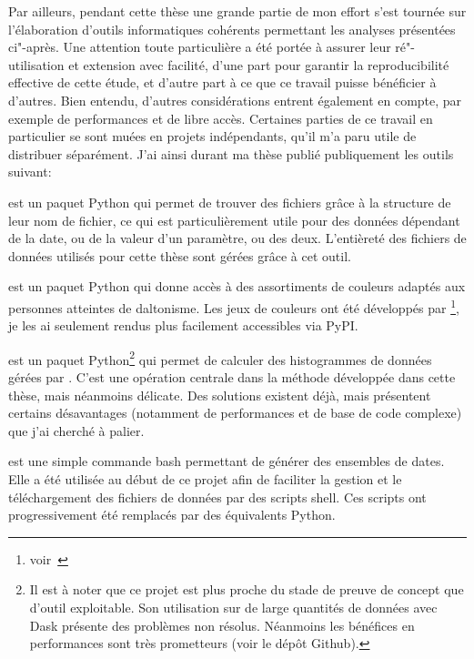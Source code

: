 Par ailleurs, pendant cette thèse une grande partie de mon effort s'est tournée sur l'élaboration d'outils informatiques cohérents  permettant les analyses présentées ci"-après.
Une attention toute particulière a été portée à assurer leur ré"-utilisation et extension avec facilité, d'une part pour garantir la reproducibilité effective de cette étude, et d'autre part à ce que ce travail puisse bénéficier à d'autres.
Bien entendu, d'autres considérations entrent également en compte, par exemple de performances et de libre accès.
Certaines parties de ce travail en particulier se sont muées en projets indépendants, qu'il m'a paru utile de distribuer séparément.
J'ai ainsi durant ma thèse publié publiquement les outils suivant:
\begingroup
\resetbegentry
{}
\begin{description}
  \setlength{\itemsep}{1.8\onelineskip}
  \item[FileFinder]
        est un paquet Python qui permet  de trouver des fichiers grâce à la structure de leur nom de fichier, ce qui est particulièrement utile pour des données dépendant de la date, ou de la valeur d'un paramètre, ou des deux.
        L'entièreté des fichiers de données utilisés pour cette thèse sont gérées grâce à cet outil.

  \item[tol-colors]
        est un paquet Python qui donne accès à des assortiments de couleurs adaptés aux personnes atteintes de daltonisme.
        Les jeux de couleurs ont été développés par \footnote{voir~}, je les ai seulement rendus plus facilement accessibles via PyPI.

  \item[Xarray-histogram]
        est un paquet Python\footnote{%
        Il est à noter que ce projet est plus proche du stade de preuve de concept que d'outil exploitable.
        Son utilisation sur de large quantités de données avec Dask présente des problèmes non résolus.
        Néanmoins les bénéfices en performances sont très prometteurs (voir le dépôt Github).
        } qui permet de calculer des histogrammes de données gérées par .
        C'est une opération centrale dans la méthode développée dans cette thèse, mais néanmoins délicate.
        Des solutions existent déjà, mais présentent certains désavantages (notamment de performances et de base de code complexe) que j'ai cherché à palier.

  \item[dateloop]
        est une simple commande bash permettant de générer des ensembles de dates.
        Elle a été utilisée au début de ce projet afin de faciliter la gestion et le téléchargement des fichiers de données par des scripts shell. Ces scripts ont progressivement été remplacés par des équivalents Python.

\end{description}
\endgroup

